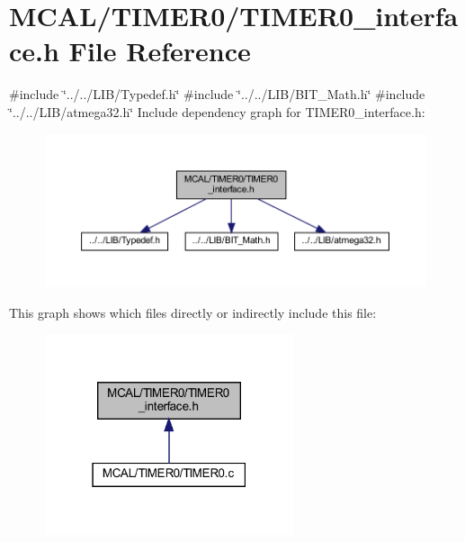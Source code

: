 \section{M\+C\+A\+L/\+T\+I\+M\+E\+R0/\+T\+I\+M\+E\+R0\+\_\+interface.h File Reference}
\label{_t_i_m_e_r0__interface_8h}
{\ttfamily \#include \char`\"{}../../\+L\+I\+B/\+Typedef.\+h\char`\"{}}\newline
{\ttfamily \#include \char`\"{}../../\+L\+I\+B/\+B\+I\+T\+\_\+\+Math.\+h\char`\"{}}\newline
{\ttfamily \#include \char`\"{}../../\+L\+I\+B/atmega32.\+h\char`\"{}}\newline
Include dependency graph for T\+I\+M\+E\+R0\+\_\+interface.\+h\+:
\nopagebreak
\begin{figure}[H]
\begin{center}
\leavevmode
\includegraphics[width=350pt]{_t_i_m_e_r0__interface_8h__incl}
\end{center}
\end{figure}
This graph shows which files directly or indirectly include this file\+:
\nopagebreak
\begin{figure}[H]
\begin{center}
\leavevmode
\includegraphics[width=207pt]{_t_i_m_e_r0__interface_8h__dep__incl}
\end{center}
\end{figure}
